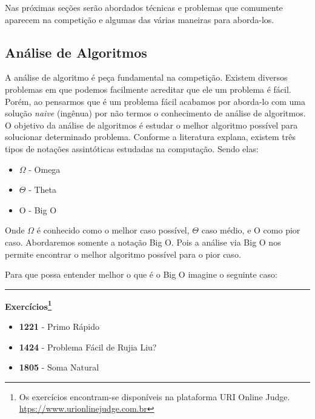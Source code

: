 Nas próximas seções serão abordados técnicas e problemas que comumente aparecem na competição e algumas das várias maneiras para aborda-los.

\subsection{Análise de Algoritmos}
A análise de algoritmo é peça fundamental na competição. Existem diversos problemas em que podemos facilmente acreditar que ele um problema é fácil. Porém, ao pensarmos que é um problema fácil acabamos por aborda-lo com uma solução \textit{naive} (ingênua) por não termos o conhecimento de análise de algoritmos. O objetivo da análise de algoritmos é estudar o melhor algoritmo possível para solucionar determinado problema.
Conforme a literatura explana, existem três tipos de notações assintóticas estudadas na computação. Sendo elas:

    \begin{itemize}
        \item $\Omega$ - Omega
        \item $\Theta$ - Theta
        \item O - Big O
    \end{itemize}
    
    Onde $\Omega$ é conhecido como o melhor caso possível, $\Theta$ caso médio, e O como pior caso. Abordaremos somente a notação Big O. Pois a análise via Big O nos permite encontrar o melhor algoritmo possível para o pior caso.
    
    Para que possa entender melhor o que é o Big O imagine o seguinte caso: 
    
    
    

\vspace{1cm}
\rule{\textwidth}{0.4pt}
\large{\textbf{Exercícios\footnote{Os exercícios encontram-se disponíveis na plataforma URI Online Judge. \url{htps://www.urionlinejudge.com.br}}}}\\

\begin{itemize}
    \item \textbf{1221} - Primo Rápido
    \item \textbf{1424} - Problema Fácil de Rujia Liu?
    \item \textbf{1805} - Soma Natural
\end{itemize}

\newpage
